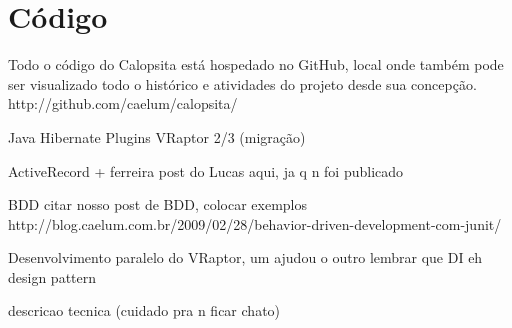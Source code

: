 \section{Código}
Todo o código do Calopsita está hospedado no GitHub, local onde também pode ser visualizado todo o histórico e atividades do projeto desde sua concepção. http://github.com/caelum/calopsita/


Java
Hibernate
Plugins
VRaptor 2/3 (migração)

ActiveRecord + ferreira
post do Lucas aqui, ja q n foi publicado

BDD
citar nosso post de BDD, colocar exemplos
http://blog.caelum.com.br/2009/02/28/behavior-driven-development-com-junit/

Desenvolvimento paralelo do VRaptor, um ajudou o outro
lembrar que DI eh design pattern

descricao tecnica (cuidado pra n ficar chato)



